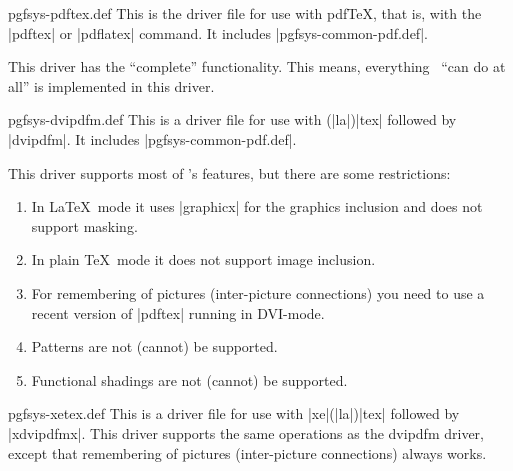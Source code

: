 \begin{filedescription}{pgfsys-pdftex.def}
  This is the driver file for use with pdf\TeX, that is, with the
  |pdftex| or |pdflatex| command. It includes
  |pgfsys-common-pdf.def|.

  This driver has the ``complete'' functionality. This means,
  everything \pgfname\ ``can do at all'' is implemented in this
  driver. 
\end{filedescription}

\begin{filedescription}{pgfsys-dvipdfm.def}
  This is a driver file for use with (|la|)|tex| followed by |dvipdfm|. It
  includes |pgfsys-common-pdf.def|.

  This driver supports most of \pgfname's features, but there are some
  restrictions:
  \begin{enumerate}
  \item
    In \LaTeX\ mode it uses |graphicx| for the graphics
    inclusion and does not support masking.
  \item
    In plain \TeX\ mode it does not support image inclusion.
  \item
    For remembering of pictures (inter-picture connections) you need
    to use a recent version of |pdftex| running in DVI-mode.
  \item
    Patterns are not (cannot) be supported.
  \item
    Functional shadings are not (cannot) be supported.
  \end{enumerate}
\end{filedescription}

\begin{filedescription}{pgfsys-xetex.def}
  This is a driver file for use with |xe|(|la|)|tex| followed by
  |xdvipdfmx|. This driver supports the same operations as the dvipdfm
  driver,  except that remembering of pictures (inter-picture
  connections)   always works.
\end{filedescription}

